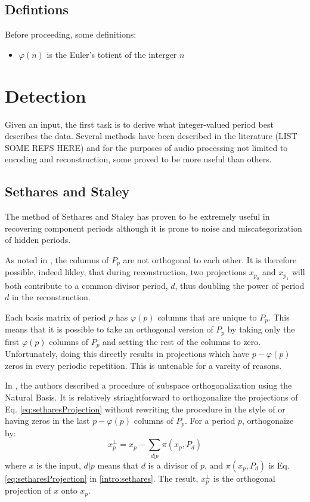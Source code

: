 \subsection{Defintions}
Before proceeding, some definitions:
\begin{itemize}
    \item $\varphi(n)$ is the Euler's totient of the interger $n$
\end{itemize}


\section{Detection}
Given an input, the first task is to derive what integer-valued period best describes the data. Several methods have been described in the literature (LIST SOME REFS HERE) and for the purposes of audio processing not limited to encoding and reconstruction, some proved to be more useful than others.

    \subsection{Sethares and Staley}
    The method of Sethares and Staley has proven to be extremely useful in recovering component periods although it is prone to noise and miscategorization of hidden periods.

    As noted in \cite{sethares1999periodicity}, the columns of $P_p$ are not orthogonal to each other. It is therefore possible, indeed likley, that during reconstruction, two projections $x_{p_0}$ and $x_{p_1}$ will both contribute to a common divisor period, $d$, thus doubling the power of period $d$ in the reconstruction.

    Each basis matrix of period $p$ has $\varphi(p)$ columns that are unique to $P_p$. This means that it is possible to take an orthogonal version of $P_p$ by taking only the first $\varphi(p)$ columns of $P_p$ and setting the rest of the columns to zero. Unfortunately, doing this directly results in projections which have $p - \varphi(p)$ zeros in every periodic repetition. This is untenable for a vareity of reasons.

    In \cite{muresan2003orthogonal}, the authors described a procedure of subspace orthogonalization using the Natural Basis. It is relatively striaghtforward to orthogonalize the projections of Eq. \ref{eq:setharesProjection} without rewriting the procedure in the style of \cite{muresan2003orthogonal} or having zeros in the last $p - \varphi(p)$ columns of $P_p$. For a period $p$, orthogonaize by:
    \begin{equation}
        x^{\perp}_{p} = x_p - \sum_{d|p} \pi(x_p, P_d)
    \end{equation}
    where $x$ is the input, $d|p$ means that $d$ is a divisor of $p$, and $\pi(x_p, P_d)$ is Eq. \ref{eq:setharesProjection} in \ref{intro:sethares}. The result, $x^{\perp}_{p}$ is the orthogonal projection of $x$ onto $x_p$.

